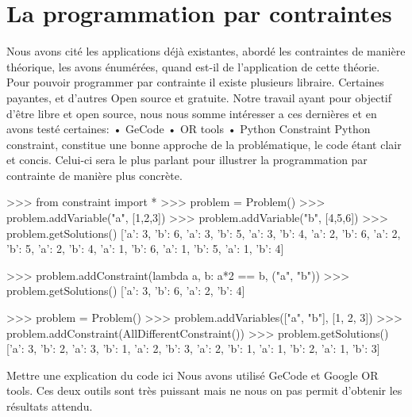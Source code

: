 \section{La programmation par contraintes}
Nous avons cité les applications déjà existantes, abordé les contraintes de manière théorique, les avons énumérées, quand est-il de l'application de cette théorie. Pour pouvoir programmer par contrainte il existe plusieurs libraire. Certaines payantes, et d'autres Open source et gratuite. Notre travail ayant pour objectif d'être libre et open source, nous nous somme intéresser a ces dernières et en avons testé certaines:
•	GeCode
•	OR tools
•	Python Constraint
Python constraint, constitue une bonne approche de la problématique, le code étant clair et concis. Celui-ci sera le plus parlant pour illustrer la programmation par contrainte de manière plus concrète.

>>> from constraint import *
>>> problem = Problem()
>>> problem.addVariable("a", [1,2,3])
>>> problem.addVariable("b", [4,5,6])
>>> problem.getSolutions()
[{'a': 3, 'b': 6}, {'a': 3, 'b': 5}, {'a': 3, 'b': 4},
 {'a': 2, 'b': 6}, {'a': 2, 'b': 5}, {'a': 2, 'b': 4},
 {'a': 1, 'b': 6}, {'a': 1, 'b': 5}, {'a': 1, 'b': 4}]

>>> problem.addConstraint(lambda a, b: a*2 == b,
                          ("a", "b"))
>>> problem.getSolutions()
[{'a': 3, 'b': 6}, {'a': 2, 'b': 4}]

>>> problem = Problem()
>>> problem.addVariables(["a", "b"], [1, 2, 3])
>>> problem.addConstraint(AllDifferentConstraint())
>>> problem.getSolutions()
[{'a': 3, 'b': 2}, {'a': 3, 'b': 1}, {'a': 2, 'b': 3},
 {'a': 2, 'b': 1}, {'a': 1, 'b': 2}, {'a': 1, 'b': 3}]

Mettre une explication du code ici
Nous avons utilisé GeCode et Google OR tools. Ces deux outils sont très puissant mais ne nous on pas permit d'obtenir les résultats attendu.

